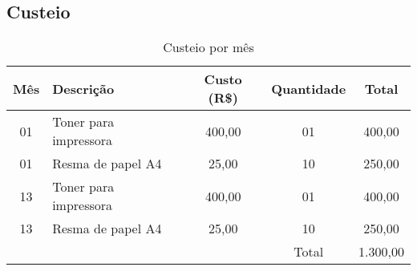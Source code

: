 \subsection{Custeio}
\begin{table}[!h]
\centering
	\caption{Custeio por mês}
\begin{tabular}{clccc}
\toprule
	Mês   & Descrição              & Custo (R\$) & Quantidade & Total \\
	\midrule
	01    & Toner para impressora  & 400,00      & 01         & 400,00 \\
	01    & Resma de papel A4      &  25,00      & 10         & 250,00 \\
	13    & Toner para impressora  & 400,00      & 01         & 400,00 \\
	13    & Resma de papel A4      &  25,00      & 10         & 250,00 \\
\midrule
	      &                        &             & Total      &1.300,00 \\
\bottomrule
\end{tabular}
	\label{tab:custeio}
\end{table}
 
